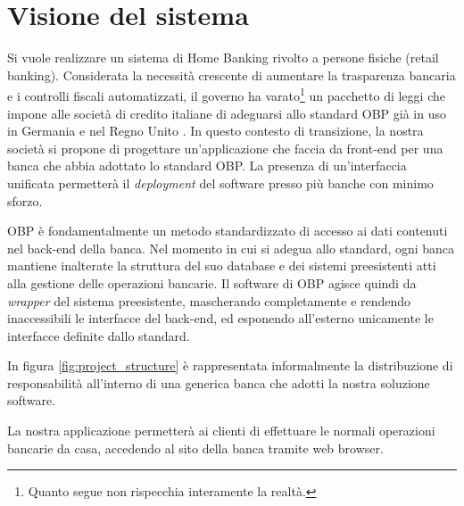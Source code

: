 \documentclass[10pt]{softeng} %
\begin{document}
\startofdocument{}

\section{Visione del sistema}

Si vuole realizzare un sistema di Home Banking rivolto a persone fisiche (retail banking).
Considerata la necessit\`a crescente di aumentare la trasparenza bancaria e i controlli fiscali automatizzati, il governo ha varato\footnote{Quanto segue non rispecchia interamente la realt\`a.} un pacchetto di leggi che impone alle societ\`a di credito italiane di adeguarsi allo standard OBP \cite{obp} gi\`a in uso in Germania e nel Regno Unito \cite{obpuk}.
In questo contesto di transizione, la nostra societ\`a si propone di progettare un'applicazione che faccia da front-end per una banca che abbia adottato lo standard OBP.
La presenza di un'interfaccia unificata permetter\`a il \emph{deployment} del software presso pi\`u banche con minimo sforzo.

OBP \`e fondamentalmente un metodo standardizzato di accesso ai dati contenuti nel back-end della banca.
Nel momento in cui si adegua allo standard, ogni banca mantiene inalterate la struttura del suo database e dei sistemi preesistenti atti alla gestione delle operazioni bancarie.
Il software di OBP agisce quindi da \emph{wrapper} del sistema preesistente, mascherando completamente e rendendo inaccessibili le interfacce del back-end, ed esponendo all'esterno unicamente le interfacce definite dallo standard.

In figura \ref{fig:project_structure} \`e rappresentata informalmente la distribuzione di responsabilit\`a all'interno di una generica banca che adotti la nostra soluzione software.

La nostra applicazione permetter\`a ai clienti di effettuare le normali operazioni bancarie da casa, accedendo al sito della banca tramite web browser.
\end{document}
